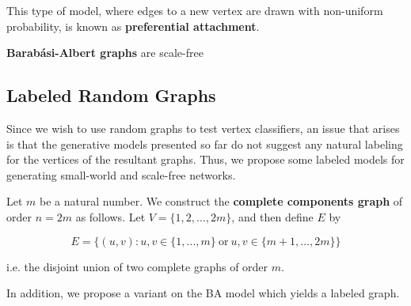 This type of model, where edges to a new vertex are drawn with non-uniform
probability, is known as \textbf{preferential attachment}.

\begin{theorem}
  \textbf{Barab\'asi-Albert graphs} are scale-free
\end{theorem}


\subsection{Labeled Random Graphs}

Since we wish to use random graphs to test vertex classifiers, an issue that
arises is that the generative models presented so far do not suggest any natural
labeling for the vertices of the resultant graphs. Thus, we propose some labeled
models for generating small-world and scale-free networks.

\begin{definition}
  Let $m$ be a natural number. We construct the \textbf{complete components
    graph} of order $n = 2m$ as follows. Let $V = \{1,2, ..., 2m\}$, and then define
  $E$ by

  \[
    E = \{ (u,v) : u,v \in \{1,...,m\} ~\text{or}~ u,v \in \{m+1,...,2m\} \}
  \]

  i.e. the disjoint union of two complete graphs of order $m$.
\end{definition}


In addition, we propose a variant on the BA model which yields a labeled graph.



